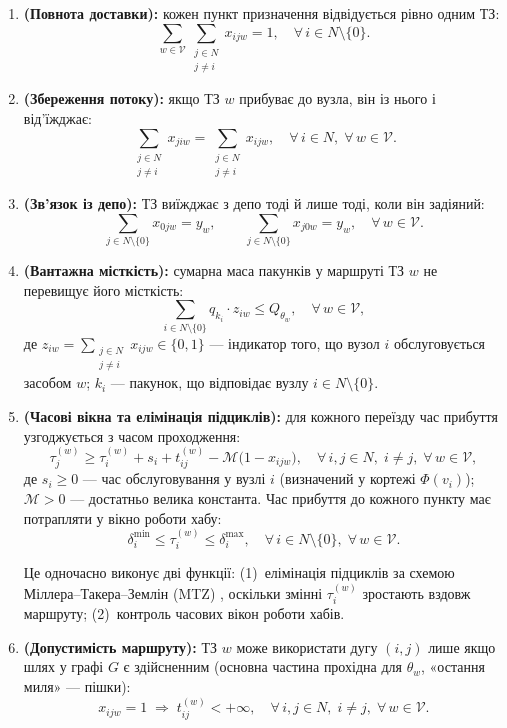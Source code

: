 \documentclass[14pt,a4paper]{extarticle}
\theoremstyle{definition}
\theoremstyle{plain}
\begin{document}
\begin{enumerate}[label=\textbf{О\arabic*.}, leftmargin=3em]
    \item \textbf{(Повнота доставки):} кожен пункт призначення відвідується рівно одним ТЗ:
    \[
        \sum_{w \in \mathcal{V}} \sum_{\substack{j \in N \\ j \neq i}} x_{ijw} = 1, \quad \forall\, i \in N \setminus \{0\}.
    \]

    \item \textbf{(Збереження потоку):} якщо ТЗ $w$ прибуває до вузла, він із нього і від'їжджає:
    \[
        \sum_{\substack{j \in N \\ j \neq i}} x_{jiw} = \sum_{\substack{j \in N \\ j \neq i}} x_{ijw}, \quad \forall\, i \in N,\; \forall\, w \in \mathcal{V}.
    \]

    \item \textbf{(Зв'язок із депо):} ТЗ виїжджає з депо тоді й лише тоді, коли він задіяний:
    \[
        \sum_{j \in N \setminus \{0\}} x_{0jw} = y_w, \qquad
        \sum_{j \in N \setminus \{0\}} x_{j0w} = y_w, \quad \forall\, w \in \mathcal{V}.
    \]

    \item \textbf{(Вантажна місткість):} сумарна маса пакунків у маршруті ТЗ $w$ не перевищує його місткість:
    \[
        \sum_{i \in N \setminus \{0\}} q_{k_i} \cdot z_{iw} \leq Q_{\theta_w}, \quad \forall\, w \in \mathcal{V},
    \]
    де $z_{iw} = \displaystyle\sum_{\substack{j \in N \\ j \neq i}} x_{ijw} \in \{0, 1\}$ --- індикатор того, що вузол $i$ обслуговується засобом $w$; $k_{i}$ --- пакунок, що відповідає вузлу $i \in N \setminus \{0\}$.

    \item \textbf{(Часові вікна та елімінація підциклів):} для кожного переїзду час прибуття узгоджується з часом проходження:
    \[
        \tau_j^{(w)} \geq \tau_i^{(w)} + s_i + t_{ij}^{(w)} - \mathcal{M}\bigl(1 - x_{ijw}\bigr), \quad \forall\, i,j \in N,\; i \neq j,\; \forall\, w \in \mathcal{V},
    \]
    де $s_i \geq 0$ --- час обслуговування у вузлі $i$ (визначений у кортежі $\Phi(v_i)$); $\mathcal{M} > 0$ --- достатньо велика константа. Час прибуття до кожного пункту має потрапляти у вікно роботи хабу:
    \[
        \delta_i^{\min} \leq \tau_i^{(w)} \leq \delta_i^{\max}, \quad \forall\, i \in N \setminus \{0\},\; \forall\, w \in \mathcal{V}.
    \]

    Це одночасно виконує дві функції: (1)~елімінація підциклів за схемою Міллера--Такера--Землін (MTZ) \cite{mtz1960}, оскільки змінні $\tau_i^{(w)}$ зростають вздовж маршруту; (2)~контроль часових вікон роботи хабів.

    \item \textbf{(Допустимість маршруту):} ТЗ $w$ може використати дугу $(i, j)$ лише якщо шлях у графі $G$ є здійсненним (основна частина прохідна для $\theta_w$, «остання миля» --- пішки):
    \[
        x_{ijw} = 1 \;\Rightarrow\; t_{ij}^{(w)} < +\infty, \quad \forall\, i,j \in N,\; i \neq j,\; \forall\, w \in \mathcal{V}.
    \]
\end{enumerate}
\end{document}
